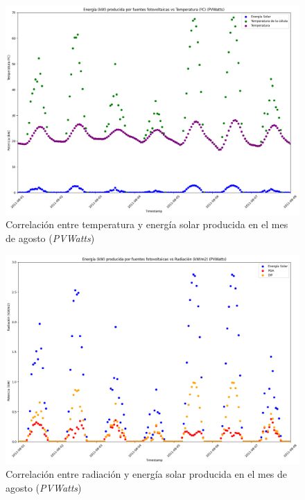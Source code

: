 \vspace{3mm}

\begin{figure}[H]
  \centering
  \includegraphics[width=1\textwidth]{img/diseno/energiavstempcel.png}
  \caption{Correlación entre temperatura y energía solar producida en el mes de agosto (\textit{PVWatts})}
  \label{fig:energiavstempcel}
\end{figure}

\begin{figure}[H]
  \centering
  \includegraphics[width=1\textwidth]{img/diseno/energiavsrad.png}
  \caption{Correlación entre radiación y energía solar producida en el mes de agosto (\textit{PVWatts})}
  \label{fig:energiavsrad}
\end{figure}

